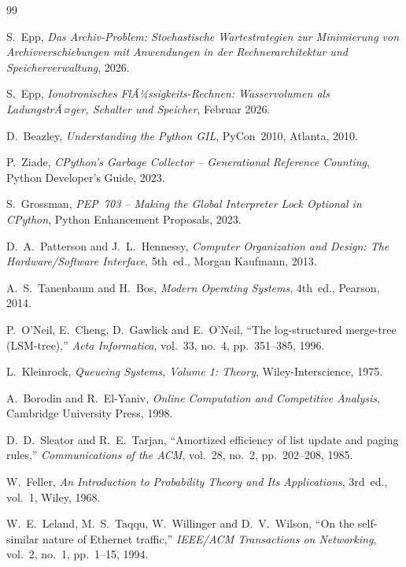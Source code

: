 ﻿\documentclass[a4paper,12pt]{scrreprt}
\theoremstyle{definition}
\begin{document}
	\begin{thebibliography}{99}
		
		
		S.~Epp,
		\textit{Das Archiv-Problem: Stochastische Wartestrategien zur Minimierung
			von Archivverschiebungen mit Anwendungen in der Rechnerarchitektur
			und Speicherverwaltung}, 2026.
		
		S.~Epp,
		\textit{Ionotronisches FlÃ¼ssigkeits-Rechnen: Wasservolumen als
			LadungstrÃ¤ger, Schalter und Speicher}, Februar 2026.
		
		D.~Beazley,
		\textit{Understanding the Python GIL},
		PyCon~2010, Atlanta, 2010.
		
		P.~Ziade,
		\textit{CPython's Garbage Collector -- Generational Reference Counting},
		Python Developer's Guide, 2023.
		
		S.~Grossman,
		\textit{PEP~703 -- Making the Global Interpreter Lock Optional in CPython},
		Python Enhancement Proposals, 2023.
		
		D.~A.~Patterson and J.~L.~Hennessy,
		\textit{Computer Organization and Design: The Hardware/Software Interface},
		5th~ed., Morgan Kaufmann, 2013.
		
		A.~S.~Tanenbaum and H.~Bos,
		\textit{Modern Operating Systems}, 4th~ed., Pearson, 2014.
		
		P.~O'Neil, E.~Cheng, D.~Gawlick and E.~O'Neil,
		``The log-structured merge-tree (LSM-tree),''
		\textit{Acta Informatica}, vol.~33, no.~4, pp.~351--385, 1996.
		
		L.~Kleinrock,
		\textit{Queueing Systems, Volume 1: Theory},
		Wiley-Interscience, 1975.
		
		A.~Borodin and R.~El-Yaniv,
		\textit{Online Computation and Competitive Analysis},
		Cambridge University Press, 1998.
		
		D.~D.~Sleator and R.~E.~Tarjan,
		``Amortized efficiency of list update and paging rules,''
		\textit{Communications of the ACM}, vol.~28, no.~2, pp.~202--208, 1985.
		
		W.~Feller,
		\textit{An Introduction to Probability Theory and Its Applications},
		3rd~ed., vol.~1, Wiley, 1968.
		
		W.~E.~Leland, M.~S.~Taqqu, W.~Willinger and D.~V.~Wilson,
		``On the self-similar nature of Ethernet traffic,''
		\textit{IEEE/ACM Transactions on Networking}, vol.~2, no.~1, pp.~1--15, 1994.
		

\end{thebibliography}
\end{document}
